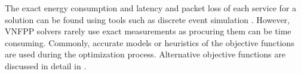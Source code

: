 The exact energy consumption and latency and packet loss of each service for a solution can be found using tools such as discrete event simulation \cite{Pongor93}. However, VNFPP solvers rarely use exact measurements as procuring them can be time consuming. Commonly, accurate models or heuristics of the objective functions are used during the optimization process. Alternative objective functions are discussed in detail in .
